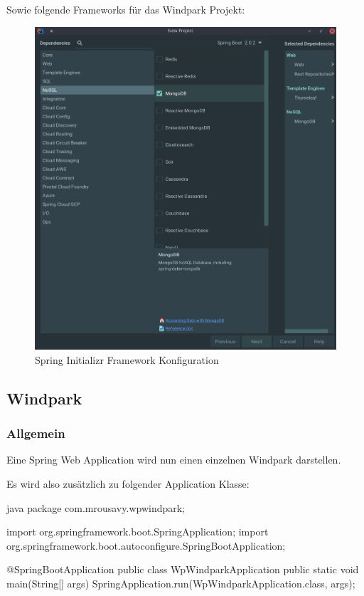 Sowie folgende Frameworks für das Windpark Projekt:

\begin{figure}
    \caption{Spring Initializr Framework Konfiguration}
    \includegraphics[width=15cm]{images/initializr-frameworks}
    \centering
\end{figure}

\clearpage
\subsection{Windpark}

\subsubsection{Allgemein}

Eine Spring Web Application wird nun einen einzelnen Windpark darstellen.

Es wird also zusätzlich zu folgender Application Klasse:

\begin{code}{java}
    package com.mrousavy.wpwindpark;

    import org.springframework.boot.SpringApplication;
    import org.springframework.boot.autoconfigure.SpringBootApplication;

    @SpringBootApplication
    public class WpWindparkApplication {
        public static void main(String[] args) {
            SpringApplication.run(WpWindparkApplication.class, args);
        }
    }
\end{code}

